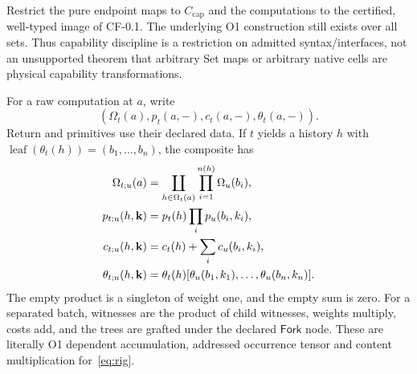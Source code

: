 \documentclass[11pt,a4paper]{article}
\theoremstyle{definition}
\newcommand{\leaf}{\operatorname{leaf}}
\begin{document}
Restrict the pure endpoint maps to $C_{\mathrm{cap}}$ and the computations
to the certified, well-typed image of CF-0.1. The underlying O1 construction
still exists over all sets. Thus capability discipline is a restriction on
admitted syntax/interfaces, not an unsupported theorem that arbitrary Set
maps or arbitrary native cells are physical capability transformations.

For a raw computation at $a$, write
\[
 (\Omega_t(a),p_t(a,-),c_t(a,-),\theta_t(a,-)).
\]
Return and primitives use their declared data. If $t$ yields a history
$h$ with $\leaf(\theta_t(h))=(b_1,\ldots,b_n)$, the composite has
\begin{align}\label{eq:raw-composition}
 \Omega_{t;u}(a)
 &=\coprod_{h\in\Omega_t(a)}\prod_{i=1}^{n(h)}\Omega_u(b_i),\notag\\
 p_{t;u}(h,\mathbf k)&=p_t(h)\prod_i p_u(b_i,k_i),\notag\\
 c_{t;u}(h,\mathbf k)&=c_t(h)+\sum_i c_u(b_i,k_i),\\
 \theta_{t;u}(h,\mathbf k)
 &=\theta_t(h)[\theta_u(b_1,k_1),\ldots,\theta_u(b_n,k_n)].\notag
\end{align}
The empty product is a singleton of weight one, and the empty sum is zero.
For a separated batch, witnesses are the product of child witnesses,
weights multiply, costs add, and the trees are grafted under the declared
$\mathsf{Fork}$ node. These are literally O1 dependent accumulation,
addressed occurrence tensor and content multiplication for~\eqref{eq:rig}.
\end{document}
